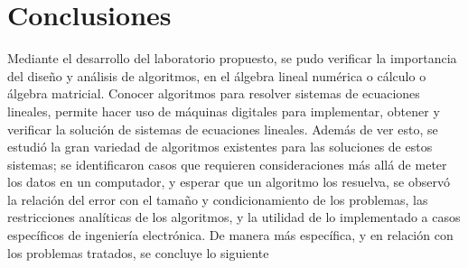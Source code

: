 \documentclass[11pt, spanish]{article}
\begin{document}
\section{Conclusiones}

Mediante el desarrollo del laboratorio propuesto, se pudo verificar la importancia del diseño y análisis de algoritmos, en el álgebra lineal numérica o cálculo o álgebra matricial. Conocer algoritmos para resolver sistemas de ecuaciones lineales, permite hacer uso de máquinas digitales para implementar, obtener y verificar la solución de sistemas de ecuaciones lineales. Además de ver esto, se estudió la gran variedad de algoritmos existentes para las soluciones de estos sistemas; se identificaron casos que requieren consideraciones más allá de meter los datos en un computador, y esperar que un algoritmo los resuelva, se observó la relación del error con el tamaño y condicionamiento de los problemas, las restricciones analíticas de los algoritmos, y la utilidad de lo implementado a casos específicos de ingeniería electrónica. De manera más específica, y en relación con los problemas tratados, se concluye lo siguiente
\end{document}
